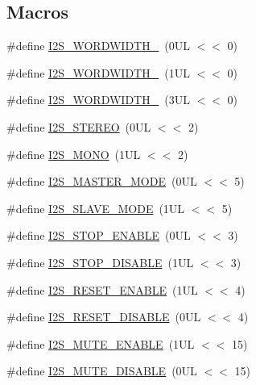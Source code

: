 \subsection*{Macros}
\begin{DoxyCompactItemize}
\item 
\#define \hyperlink{group__I2S__17XX__40XX_ga17cb1a91d5be4e7afad486ead6d2980d}{I2\-S\-\_\-\-W\-O\-R\-D\-W\-I\-D\-T\-H\-\_}~(0\-U\-L $<$$<$ 0)
\item 
\#define \hyperlink{group__I2S__17XX__40XX_ga4d016baad0fba07da20a6410470c71d3}{I2\-S\-\_\-\-W\-O\-R\-D\-W\-I\-D\-T\-H\-\_}~(1\-U\-L $<$$<$ 0)
\item 
\#define \hyperlink{group__I2S__17XX__40XX_ga683d81436e91c1631bdd5947ee78489b}{I2\-S\-\_\-\-W\-O\-R\-D\-W\-I\-D\-T\-H\-\_}~(3\-U\-L $<$$<$ 0)
\item 
\#define \hyperlink{group__I2S__17XX__40XX_ga07e34ebc83183644aa54cc124b769a43}{I2\-S\-\_\-\-S\-T\-E\-R\-E\-O}~(0\-U\-L $<$$<$ 2)
\item 
\#define \hyperlink{group__I2S__17XX__40XX_ga3c732d1467300d87c582a1497e8dbadf}{I2\-S\-\_\-\-M\-O\-N\-O}~(1\-U\-L $<$$<$ 2)
\item 
\#define \hyperlink{group__I2S__17XX__40XX_ga67cd00ecbec35d0dd723909916fb1014}{I2\-S\-\_\-\-M\-A\-S\-T\-E\-R\-\_\-\-M\-O\-D\-E}~(0\-U\-L $<$$<$ 5)
\item 
\#define \hyperlink{group__I2S__17XX__40XX_ga37137132251bc15250edcea1585d3e58}{I2\-S\-\_\-\-S\-L\-A\-V\-E\-\_\-\-M\-O\-D\-E}~(1\-U\-L $<$$<$ 5)
\item 
\#define \hyperlink{group__I2S__17XX__40XX_gabe1e11f6f4ce8542408e466b3316ca3c}{I2\-S\-\_\-\-S\-T\-O\-P\-\_\-\-E\-N\-A\-B\-L\-E}~(0\-U\-L $<$$<$ 3)
\item 
\#define \hyperlink{group__I2S__17XX__40XX_gaf442a366f6467626a2f72fdabf9b6d89}{I2\-S\-\_\-\-S\-T\-O\-P\-\_\-\-D\-I\-S\-A\-B\-L\-E}~(1\-U\-L $<$$<$ 3)
\item 
\#define \hyperlink{group__I2S__17XX__40XX_gae090c11fade3a6f9bf9791dba1920556}{I2\-S\-\_\-\-R\-E\-S\-E\-T\-\_\-\-E\-N\-A\-B\-L\-E}~(1\-U\-L $<$$<$ 4)
\item 
\#define \hyperlink{group__I2S__17XX__40XX_gaf008515f40666122bb1936e591b7ed99}{I2\-S\-\_\-\-R\-E\-S\-E\-T\-\_\-\-D\-I\-S\-A\-B\-L\-E}~(0\-U\-L $<$$<$ 4)
\item 
\#define \hyperlink{group__I2S__17XX__40XX_ga3f418f8bc5e6f401481d3b9e241758bb}{I2\-S\-\_\-\-M\-U\-T\-E\-\_\-\-E\-N\-A\-B\-L\-E}~(1\-U\-L $<$$<$ 15)
\item 
\#define \hyperlink{group__I2S__17XX__40XX_ga7d6c53914dea99eecc1d59eefbdbf5aa}{I2\-S\-\_\-\-M\-U\-T\-E\-\_\-\-D\-I\-S\-A\-B\-L\-E}~(0\-U\-L $<$$<$ 15)
$$
\end{DoxyCompactItemize}

